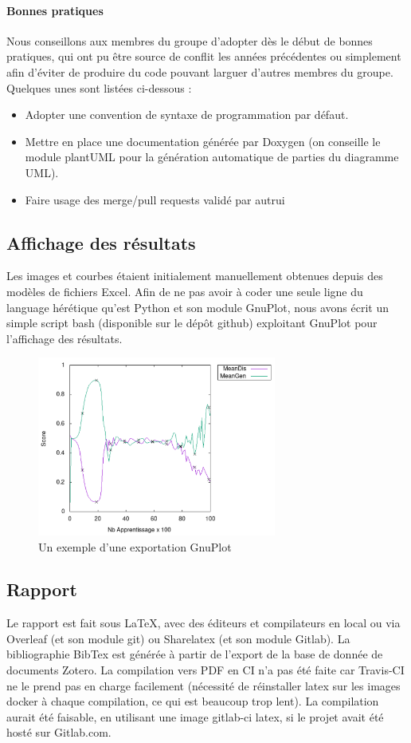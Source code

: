 \paragraph{Bonnes pratiques}
Nous conseillons aux membres du groupe d'adopter dès le début de bonnes pratiques, qui ont pu être source de conflit les années précédentes ou simplement afin d'éviter de produire du code pouvant larguer d'autres membres du groupe. Quelques unes sont listées ci-dessous :
\begin{itemize}
\item Adopter une convention de syntaxe de programmation par défaut.
\item Mettre en place une documentation générée par Doxygen (on conseille le module plantUML pour la génération automatique de parties du diagramme UML). 
\item Faire usage des merge/pull requests validé par autrui
\end{itemize}

\subsection{Affichage des résultats}
Les images et courbes étaient initialement manuellement obtenues depuis des modèles de fichiers Excel.
Afin de ne pas avoir à coder une seule ligne du language hérétique qu'est Python et son module GnuPlot, nous avons écrit un simple script bash (disponible sur le dépôt github) exploitant GnuPlot pour l'affichage des résultats. 
\begin{figure}[!h]
\begin{center}
\includegraphics[width=0.7\textwidth]{images/18_02_22-GnuPlot.png}
\caption{Un exemple d'une exportation GnuPlot}
\label{fig:type-appr-GAN}
\end{center}
\end{figure} 
\subsection{Rapport}
Le rapport est fait sous LaTeX, avec des éditeurs et compilateurs en local ou via Overleaf (et son module git) ou Sharelatex (et son module Gitlab). La bibliographie BibTex est générée à partir de l'export de la base de donnée de documents Zotero. La compilation vers PDF en CI n'a pas été faite car Travis-CI ne le prend pas en charge facilement (nécessité de réinstaller latex sur les images docker à chaque compilation, ce qui est beaucoup trop lent). La compilation aurait été faisable, en utilisant une image gitlab-ci latex, si le projet avait été hosté sur Gitlab.com.

